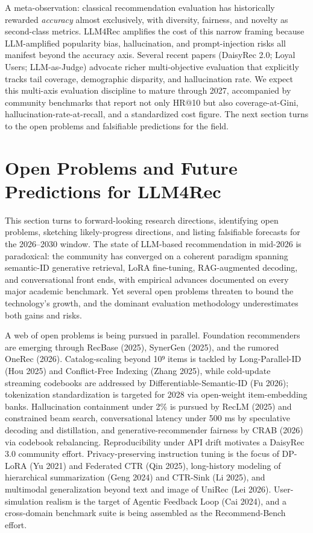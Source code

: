 A meta-observation: classical recommendation evaluation has historically rewarded \emph{accuracy} almost exclusively, with diversity, fairness, and novelty as second-class metrics. LLM4Rec amplifies the cost of this narrow framing because LLM-amplified popularity bias, hallucination, and prompt-injection risks all manifest beyond the accuracy axis. Several recent papers (DaisyRec 2.0; Loyal Users; LLM-as-Judge) advocate richer multi-objective evaluation that explicitly tracks tail coverage, demographic disparity, and hallucination rate. We expect this multi-axis evaluation discipline to mature through 2027, accompanied by community benchmarks that report not only HR@10 but also coverage-at-Gini, hallucination-rate-at-recall, and a standardized cost figure. The next section turns to the open problems and falsifiable predictions for the field.

\section{Open Problems and Future Predictions for LLM4Rec}\label{open-problems-and-future-predictions-for-llm4rec}

This section turns to forward-looking research directions, identifying open problems, sketching likely-progress directions, and listing falsifiable forecasts for the 2026--2030 window. The state of LLM-based recommendation in mid-2026 is paradoxical: the community has converged on a coherent paradigm spanning semantic-ID generative retrieval, LoRA fine-tuning, RAG-augmented decoding, and conversational front ends, with empirical advances documented on every major academic benchmark. Yet several open problems threaten to bound the technology's growth, and the dominant evaluation methodology underestimates both gains and risks.

A web of open problems is being pursued in parallel. Foundation recommenders are emerging through RecBase (2025), SynerGen (2025), and the rumored OneRec (2026). Catalog-scaling beyond 10⁹ items is tackled by Long-Parallel-ID (Hou 2025) and Conflict-Free Indexing (Zhang 2025), while cold-update streaming codebooks are addressed by Differentiable-Semantic-ID (Fu 2026); tokenization standardization is targeted for 2028 via open-weight item-embedding banks. Hallucination containment under 2\% is pursued by RecLM (2025) and constrained beam search, conversational latency under 500 ms by speculative decoding and distillation, and generative-recommender fairness by CRAB (2026) via codebook rebalancing. Reproducibility under API drift motivates a DaisyRec 3.0 community effort. Privacy-preserving instruction tuning is the focus of DP-LoRA (Yu 2021) and Federated CTR (Qin 2025), long-history modeling of hierarchical summarization (Geng 2024) and CTR-Sink (Li 2025), and multimodal generalization beyond text and image of UniRec (Lei 2026). User-simulation realism is the target of Agentic Feedback Loop (Cai 2024), and a cross-domain benchmark suite is being assembled as the Recommend-Bench effort.

